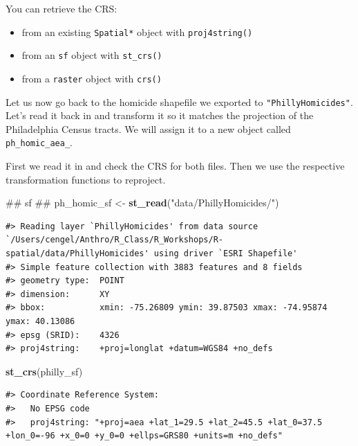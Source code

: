 \documentclass[]{book}
\newenvironment{Shaded}{\begin{snugshade}}{\end{snugshade}}
\newcommand{\KeywordTok}[1]{\textcolor[rgb]{0.13,0.29,0.53}{\textbf{#1}}}
\newcommand{\StringTok}[1]{\textcolor[rgb]{0.31,0.60,0.02}{#1}}
\newcommand{\NormalTok}[1]{#1}
\providecommand{\tightlist}{%
  \setlength{\itemsep}{0pt}\setlength{\parskip}{0pt}}
\theoremstyle{definition}
\theoremstyle{definition}
\theoremstyle{definition}
\theoremstyle{remark}
\begin{document}
You can retrieve the CRS:

\begin{itemize}
\tightlist
\item
  from an existing \texttt{Spatial*} object with \texttt{proj4string()}
\item
  from an \texttt{sf} object with \texttt{st\_crs()}
\item
  from a \texttt{raster} object with \texttt{crs()}
\end{itemize}

Let us now go back to the homicide shapefile we exported to
\texttt{"PhillyHomicides"}. Let's read it back in and transform it so it
matches the projection of the Philadelphia Census tracts. We will assign
it to a new object called \texttt{ph\_homic\_aea\_}.

First we read it in and check the CRS for both files. Then we use the
respective transformation functions to reproject.

\begin{Shaded}
\begin{Highlighting}[]
\NormalTok{## sf ##}
\NormalTok{ph_homic_sf <-}\StringTok{ }\KeywordTok{st_read}\NormalTok{(}\StringTok{"data/PhillyHomicides/"}\NormalTok{)}
\end{Highlighting}
\end{Shaded}

\begin{verbatim}
#> Reading layer `PhillyHomicides' from data source `/Users/cengel/Anthro/R_Class/R_Workshops/R-spatial/data/PhillyHomicides' using driver `ESRI Shapefile'
#> Simple feature collection with 3883 features and 8 fields
#> geometry type:  POINT
#> dimension:      XY
#> bbox:           xmin: -75.26809 ymin: 39.87503 xmax: -74.95874 ymax: 40.13086
#> epsg (SRID):    4326
#> proj4string:    +proj=longlat +datum=WGS84 +no_defs
\end{verbatim}

\begin{Shaded}
\begin{Highlighting}[]
\KeywordTok{st_crs}\NormalTok{(philly_sf)}
\end{Highlighting}
\end{Shaded}

\begin{verbatim}
#> Coordinate Reference System:
#>   No EPSG code
#>   proj4string: "+proj=aea +lat_1=29.5 +lat_2=45.5 +lat_0=37.5 +lon_0=-96 +x_0=0 +y_0=0 +ellps=GRS80 +units=m +no_defs"
\end{verbatim}
\end{document}
